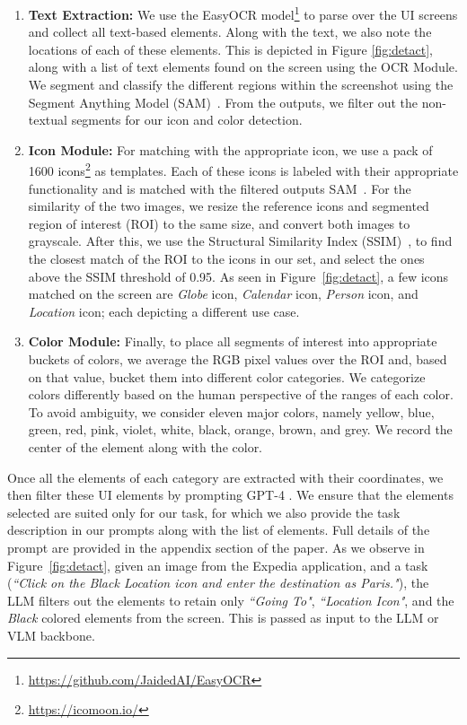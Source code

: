 \begin{enumerate}
    \item \textbf{Text Extraction:} We use the EasyOCR model\footnote{\url{https://github.com/JaidedAI/EasyOCR}} to parse over the UI screens and collect all text-based elements. Along with the text, we also note the locations of each of these elements. This is depicted in Figure \ref{fig:detact}, along with a list of text elements found on the screen using the OCR Module. We segment and classify the different regions within the screenshot using the Segment Anything Model (SAM)~\cite{kirillov2023segment}. From the outputs, we filter out the non-textual segments for our icon and color detection.%
    
\item \textbf{Icon Module:} For matching with the appropriate icon, we use a pack of 1600 icons\footnote{\url{https://icomoon.io/}} as templates. Each of these icons is labeled with their appropriate functionality and is matched with the filtered outputs SAM~\cite{kirillov2023segment}. For the similarity of the two images, we resize the reference icons and segmented region of interest (ROI) to the same size, and convert both images to grayscale. After this, we use the Structural Similarity Index (SSIM)~\cite{wang2004image}, to find the closest match of the ROI to the icons in our set, and select the ones above the SSIM threshold of 0.95. As seen in Figure~\ref{fig:detact}, a few icons matched on the screen are \textit{Globe} icon, \textit{Calendar} icon, \textit{Person} icon, and \textit{Location} icon; each depicting a different use case. %
\item \textbf{Color Module:} Finally, to place all segments of interest into appropriate buckets of colors, we average the RGB pixel values over the ROI and, based on that value, bucket them into different color categories. We categorize colors differently based on the human perspective of the ranges of each color. To avoid ambiguity, we consider eleven major colors, namely yellow, blue, green, red, pink, violet, white, black, orange, brown, and grey. We record the center of the element along with the color. 
\end{enumerate}

Once all the elements of each category are extracted with their coordinates, we then filter these UI elements by prompting GPT-4 \cite{openai2023gpt4}. We ensure that the elements selected are suited only for our task, for which we also provide the task description in our prompts along with the list of elements. Full details of the prompt are provided in the appendix section of the paper. As we observe in Figure~\ref{fig:detact}, given an image from the Expedia application, and a task (\textit{``Click on the Black Location icon and enter the destination as Paris."}), the LLM filters out the elements to retain only \textit{``Going To"}, \textit{``Location Icon"}, and the \textit{Black} colored elements from the screen. This is passed as input to the LLM or VLM backbone. %

